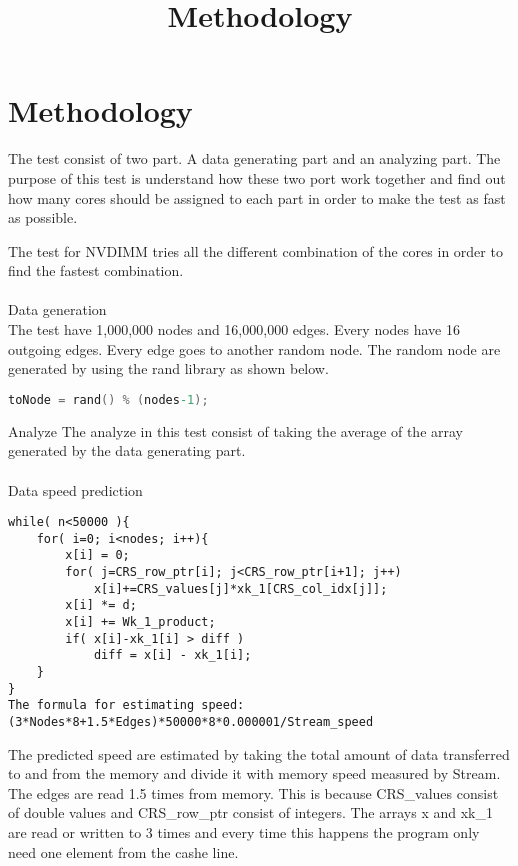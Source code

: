 \documentclass[12pt,a4paper]{article}      %
\title{Methodology}  %
\begin{document}

\section{Methodology}
The test consist of two part. A data generating part and an analyzing part. The purpose of this test is understand how these two port work together and find out how many cores should be assigned to each part in order to make the test as fast as possible.

The test for NVDIMM tries all the different combination of the cores in order to find the fastest combination.
\\
\\
Data generation\\
The test have 1,000,000 nodes and 16,000,000 edges. Every nodes have 16 outgoing edges. Every edge goes to another random node. The random node are generated by using the rand library as shown below.
\begin{lstlisting}[language=C]
toNode = rand() % (nodes-1);
\end{lstlisting}
Analyze
The analyze in this test consist of taking the average of the array generated by the data generating part.\\
\\
Data speed prediction
\begin{lstlisting}
while( n<50000 ){
	for( i=0; i<nodes; i++){
		x[i] = 0;
		for( j=CRS_row_ptr[i]; j<CRS_row_ptr[i+1]; j++)
			x[i]+=CRS_values[j]*xk_1[CRS_col_idx[j]];
		x[i] *= d;
		x[i] += Wk_1_product;
		if( x[i]-xk_1[i] > diff )
			diff = x[i] - xk_1[i];
	}
}
The formula for estimating speed:
(3*Nodes*8+1.5*Edges)*50000*8*0.000001/Stream_speed
\end{lstlisting}
The predicted speed are estimated by taking the total amount of data transferred to and from the memory and divide it with memory speed measured by Stream. The edges are read 1.5 times from memory. This is because CRS\_values consist of double values and CRS\_row\_ptr consist of integers. The arrays x and xk\_1 are read or written to 3 times and every time this happens the program only need one element from the cashe line. 
\\
\\
\end{document}
